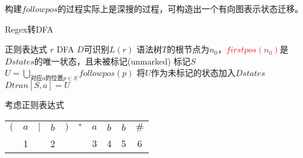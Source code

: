 构建$followpos$的过程实际上是深搜的过程，可构造出一个有向图表示状态迁移。
\begin{algorithm}[H]
\centering
\caption{Regex转DFA}
\begin{algorithmic}[1]
\Require 正则表达式 $r$
\Ensure DFA $D$可识别$L(r)$
\State 语法树$T$的根节点为$n_0$，\textcolor{red}{$firstpos(n_0)$}是$Dstates$的唯一状态，且未被标记(unmarked)
\State 标记$S$
\State $U=\bigcup_{\text{对应}a\text{的位置}p\in S} followpos(p)$
\State 将$U$作为未标记的状态加入$Dstates$
\EndIf
\State $Dtran[S,a]=U$
\EndFor
\EndWhile
\end{algorithmic}
\end{algorithm}
\begin{example}
考虑正则表达式
\begin{tabular}{cccccccccc}
$($ & $a$ & $|$ & $b$ & $)$ & ${}^*$ & $a$ & $b$ & $b$ & $\#$\\
 & 1 & & 2 & & & 3 & 4 & 5 & 6
\end{tabular}
\end{example}
